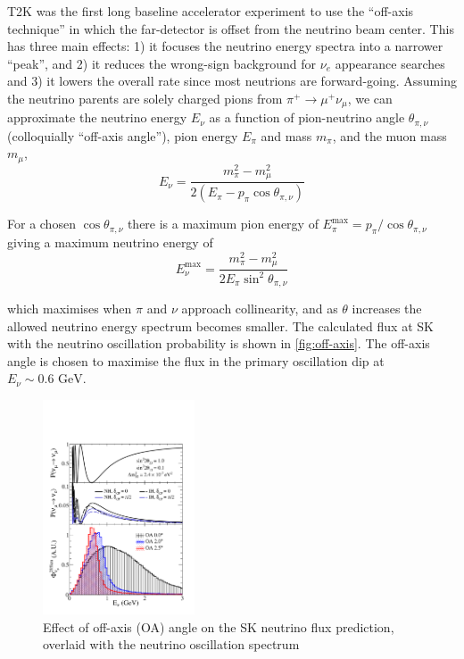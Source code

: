 T2K was the first long baseline accelerator experiment to use the ``off-axis technique'' in which the far-detector is offset from the neutrino beam center\cite{off_axis}. This has three main effects: 1) it focuses the neutrino energy spectra into a narrower ``peak'', and 2) it reduces the wrong-sign background for $\nu_e$ appearance searches and 3) it lowers the overall rate since most neutrions are forward-going. Assuming the neutrino parents are solely charged pions from $\pi^+\rightarrow\mu^+\nu_\mu$, we can approximate the neutrino energy $E_\nu$ as a function of pion-neutrino angle $\theta_{\pi,\nu}$ (colloquially ``off-axis angle''), pion energy $E_\pi$ and mass $m_\pi$, and the muon mass $m_\mu$,
\begin{equation}
	E_\nu = \frac{m^2_\pi-m^2_\mu}{2\left( E_\pi - p_\pi \cos \theta_{\pi,\nu} \right)} 
\end{equation}

For a chosen $\cos \theta_{\pi,\nu}$ there is a maximum pion energy of $E_\pi^\text{max} = p_\pi/\cos\theta_{\pi,\nu}$ giving a maximum neutrino energy of
\begin{equation}
	E_\nu^\text{max} = \frac{m^2_\pi-m^2_\mu}{2E_\pi \sin^2 \theta_{\pi,\nu}} 
\end{equation}

\noindent which maximises when $\pi$ and $\nu$ approach collinearity, and as $\theta$ increases the allowed neutrino energy spectrum becomes smaller. The calculated flux at SK with the neutrino oscillation probability is shown in \autoref{fig:off-axis}. The off-axis angle is chosen to maximise the flux in the primary oscillation dip at $E_\nu \sim 0.6\text{ GeV}$.
\begin{figure}[h]
	\includegraphics[width=0.4\textwidth, trim={0mm 0mm 0mm 0mm}, clip,page=1]{figures/det_chap/oaeffect_pnue_pnumu_flux}
	\caption{Effect of off-axis (OA) angle on the SK neutrino flux prediction, overlaid with the neutrino oscillation spectrum}
	\label{fig:off-axis}
\end{figure}

